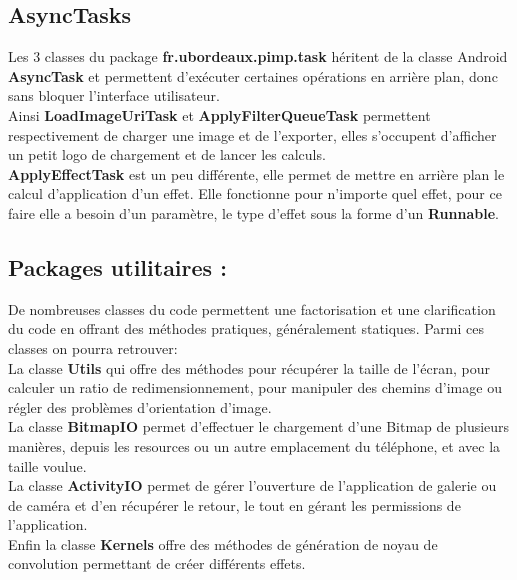 \subsection{AsyncTasks}
Les 3 classes du package \textbf{fr.ubordeaux.pimp.task} héritent de la classe Android \textbf{AsyncTask} et permettent d'exécuter certaines opérations en arrière plan, donc sans bloquer l'interface utilisateur.
\\
Ainsi \textbf{LoadImageUriTask} et \textbf{ApplyFilterQueueTask} permettent respectivement de charger une image et de l'exporter, elles s'occupent d'afficher un petit logo de chargement et de lancer les calculs.
\\
\textbf{ApplyEffectTask} est un peu différente, elle permet de mettre en arrière plan le calcul d'application d'un effet. Elle fonctionne pour n'importe quel effet, pour ce faire elle a besoin d'un paramètre, le type d'effet sous la forme d'un \textbf{Runnable}.

\subsection{Packages utilitaires :}
De nombreuses classes du code permettent une factorisation et une clarification du code en offrant des méthodes pratiques, généralement statiques. Parmi ces classes on pourra retrouver:
\\

La classe \textbf{Utils} qui offre des méthodes pour récupérer la taille de l'écran, pour calculer un ratio de redimensionnement, pour manipuler des chemins d'image ou régler des problèmes d'orientation d'image.
\\

La classe \textbf{BitmapIO} permet d'effectuer le chargement d'une Bitmap de plusieurs manières, depuis les resources ou un autre emplacement du téléphone, et avec la taille voulue.
\\

La classe \textbf{ActivityIO} permet de gérer l'ouverture de l'application de galerie ou de caméra et d'en récupérer le retour, le tout en gérant les permissions de l'application.
\\

Enfin la classe \textbf{Kernels} offre des méthodes de génération de noyau de convolution permettant de créer différents effets.
